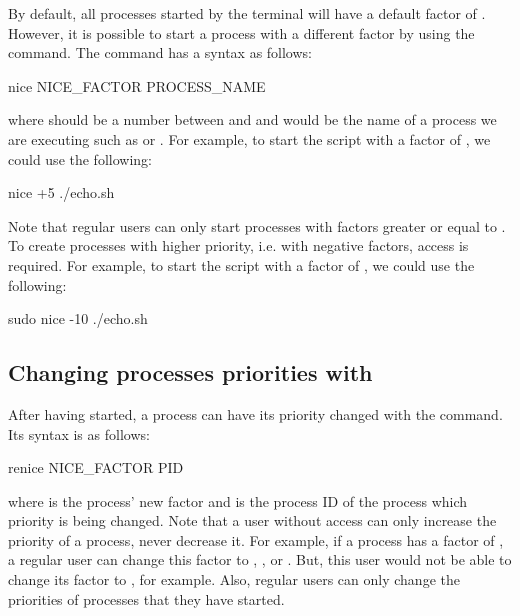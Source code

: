 By default, all processes started by the terminal will have a default  factor of . However, it is possible to start a process with a different  factor by using the  command. The  command has a syntax as follows:
\begin{command_line}[make]
nice NICE_FACTOR PROCESS_NAME
\end{command_line}
where  should be a number between  and  and  would be the name of a process we are executing such as  or .
For example, to start the  script with a  factor of , we could use the following:
\begin{command_line}[make]
nice +5 ./echo.sh
\end{command_line}
Note that regular users can only start processes with  factors greater or equal to . To create processes with higher priority, i.e. with negative  factors,  access is required. For example, to start the  script with a  factor of , we could use the following:
\begin{command_line}[make]
sudo nice -10 ./echo.sh
\end{command_line}

\subsection{Changing processes priorities with }

After having started, a process can have its priority changed with the  command. Its syntax is as follows:
\begin{command_line}[make]
renice NICE_FACTOR PID
\end{command_line}
where  is the process' new  factor and  is the process ID of the process which priority is being changed.
Note that a user without  access can only increase the priority of a process, never decrease it. For example, if a process has a  factor of , a regular user can change this  factor to , , or . But, this user would not be able to change its  factor to , for example. Also, regular users can only change the priorities of processes that they have started.

